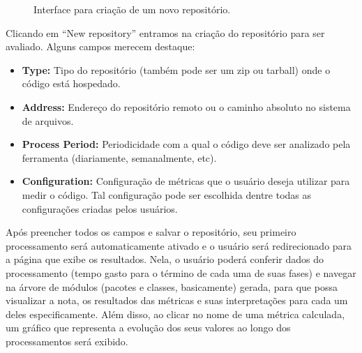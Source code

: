 \documentclass[12pt]{article}
\begin{document}
    \begin{figure}[ht]
      \centering
      \caption{Interface para criação de um novo repositório.}
      \label{fig:choose-metric}
    \end{figure}

    Clicando em ``New repository'' entramos na criação do repositório para ser avaliado. Alguns campos merecem destaque:
    \begin{itemize}
      \item \textbf{Type:} Tipo do repositório (também pode ser um zip ou tarball) onde o código está hospedado.
      \item \textbf{Address:} Endereço do repositório remoto ou o caminho absoluto no sistema de arquivos.
      \item \textbf{Process Period:} Periodicidade com a qual o código deve ser analizado pela ferramenta (diariamente, semanalmente, etc).
      \item \textbf{Configuration:} Configuração de métricas que o usuário deseja utilizar para medir o código. Tal configuração pode ser escolhida dentre todas as configurações criadas pelos usuários.
    \end{itemize}

    Após preencher todos os campos e salvar o repositório, seu primeiro processamento será automaticamente ativado e o usuário será redirecionado para a página que exibe os resultados. Nela, o usuário poderá conferir dados do processamento (tempo gasto para o término de cada uma de suas fases) e navegar na árvore de módulos (pacotes e classes, basicamente) gerada, para que possa visualizar a nota, os resultados das métricas e suas interpretações para cada um deles especificamente. Além disso, ao clicar no nome de uma métrica calculada, um gráfico que representa a evolução dos seus valores ao longo dos processamentos será exibido.
\end{document}
